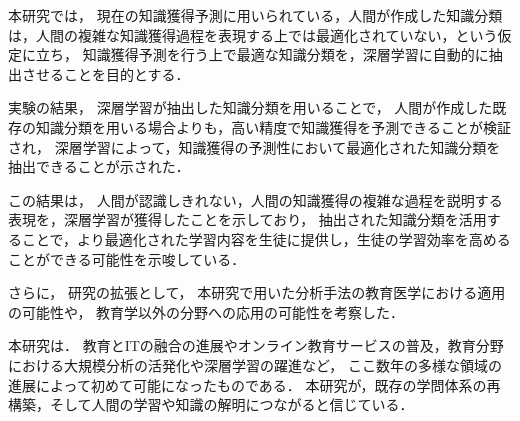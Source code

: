 本研究では，
現在の知識獲得予測に用いられている，人間が作成した知識分類は，人間の複雑な知識獲得過程を表現する上では最適化されていない，という仮定に立ち，
知識獲得予測を行う上で最適な知識分類を，深層学習に自動的に抽出させることを目的とする．

実験の結果，
深層学習が抽出した知識分類を用いることで，
人間が作成した既存の知識分類を用いる場合よりも，高い精度で知識獲得を予測できることが検証され，
深層学習によって，知識獲得の予測性において最適化された知識分類を抽出できることが示された．

この結果は，
人間が認識しきれない，人間の知識獲得の複雑な過程を説明する表現を，深層学習が獲得したことを示しており，
抽出された知識分類を活用することで，より最適化された学習内容を生徒に提供し，生徒の学習効率を高めることができる可能性を示唆している．

さらに，
研究の拡張として，
本研究で用いた分析手法の教育医学における適用の可能性や，
教育学以外の分野への応用の可能性を考察した．


本研究は．
教育とITの融合の進展やオンライン教育サービスの普及，教育分野における大規模分析の活発化や深層学習の躍進など，
ここ数年の多様な領域の進展によって初めて可能になったものである．
本研究が，既存の学問体系の再構築，そして人間の学習や知識の解明につながると信じている．
